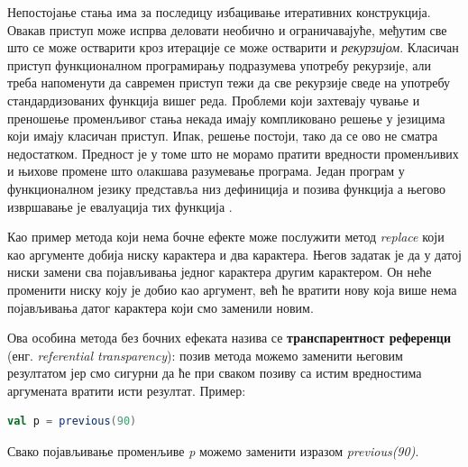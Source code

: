 \documentclass[12pt,oneside]{memoir}
\begin{document}
\par Непостојање стања има за последицу избацивање итеративних конструкција. Овакав приступ може испрва деловати необично и ограничавајуће, међутим све што се може остварити кроз итерације се може остварити и \textit{рекурзијом}. Класичан приступ функционалном програмирању подразумева употребу рекурзије, али треба напоменути да савремен приступ тежи да све рекурзије сведе на употребу стандардизованих функција вишег реда. Проблеми који захтевају чување и преношење променљивог стања некада имају компликовано решење у језицима који имају класичан приступ. Ипак, решење постоји, тако да се ово не сматра недостатком. Предност је у томе што не морамо пратити вредности променљивих и њихове промене што олакшава разумевање програма. Један програм у функционалном језику представља низ дефиниција и позива функција а његово извршавање је евалуација тих функција \cite{funkMilena}. 
\par Као пример метода који нема бочне ефекте може послужити метод \textit{replace} који као аргументе добија ниску карактера и два карактера. Његов задатак је да у датој ниски замени сва појављивања једног карактера другим карактером. Он неће променити ниску коју је добио као аргумент, већ ће вратити нову која више нема појављивања датог карактера који смо заменили новим.  
\par Ова особина метода без бочних ефеката назива се \textbf{транспарентност референци} (енг. \textit{referential transparency}): позив метода можемо заменити његовим резултатом јер смо сигурни да ће при сваком позиву са истим вредностима аргумената вратити исти резултат. Пример:

\begin{lstlisting}[language=Scala]
val p = previous(90)
\end{lstlisting}
Свако појављивање променљиве \textit{p} можемо заменити изразом \textit{previous(90)}.
\end{document}
